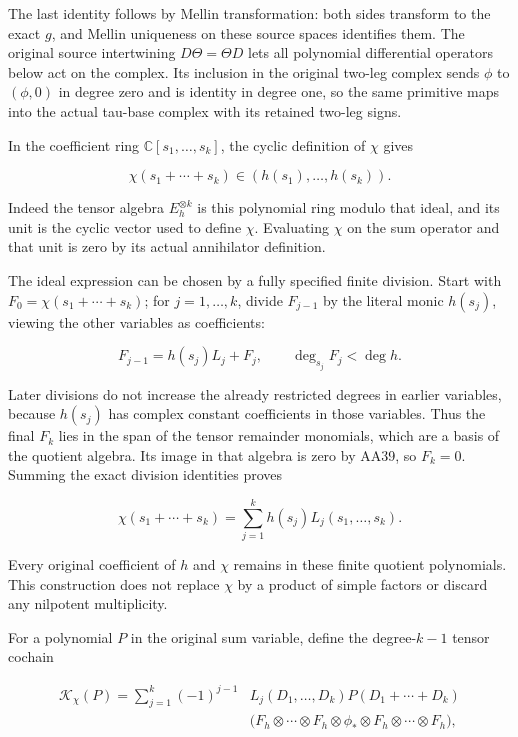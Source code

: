 The last identity follows by Mellin transformation: both sides transform to the exact \(g\), and Mellin uniqueness on these source spaces identifies them. The original source intertwining \(D\Theta=\Theta D\) lets all polynomial differential operators below act on the complex. Its inclusion in the original two-leg complex sends \(\phi\) to \((\phi,0)\) in degree zero and is identity in degree one, so the same primitive maps into the actual tau-base complex with its retained two-leg signs.

In the coefficient ring \(\mathbb C[s_1,\ldots,s_k]\), the cyclic definition of \(\chi\) gives

\[
\chi(s_1+\cdots+s_k)\in(h(s_1),\ldots,h(s_k)).
\tag{AA39}
\]

Indeed the tensor algebra \(E_h^{\otimes k}\) is this polynomial ring modulo that ideal, and its unit is the cyclic vector used to define \(\chi\). Evaluating \(\chi\) on the sum operator and that unit is zero by its actual annihilator definition.

The ideal expression can be chosen by a fully specified finite division. Start with \(F_0=\chi(s_1+\cdots+s_k)\); for \(j=1,\ldots,k\), divide \(F_{j-1}\) by the literal monic \(h(s_j)\), viewing the other variables as coefficients:

\[
F_{j-1}=h(s_j)L_j+F_j,\qquad\deg_{s_j}F_j<\deg h.
\tag{AA40}
\]

Later divisions do not increase the already restricted degrees in earlier variables, because \(h(s_j)\) has complex constant coefficients in those variables. Thus the final \(F_k\) lies in the span of the tensor remainder monomials, which are a basis of the quotient algebra. Its image in that algebra is zero by AA39, so \(F_k=0\). Summing the exact division identities proves

\[
\chi(s_1+\cdots+s_k)=\sum_{j=1}^k h(s_j)L_j(s_1,\ldots,s_k).
\tag{AA41}
\]

Every original coefficient of \(h\) and \(\chi\) remains in these finite quotient polynomials. This construction does not replace \(\chi\) by a product of simple factors or discard any nilpotent multiplicity.

For a polynomial \(P\) in the original sum variable, define the degree-\(k-1\) tensor cochain

\[
\begin{aligned}
\mathcal K_\chi(P)=\sum_{j=1}^k(-1)^{j-1}
&L_j(D_1,\ldots,D_k)P(D_1+\cdots+D_k)\\
&\bigl(F_h\otimes\cdots\otimes F_h
\otimes\phi_*\otimes F_h\otimes\cdots\otimes F_h\bigr),
\end{aligned}
\tag{AA42}
\]

